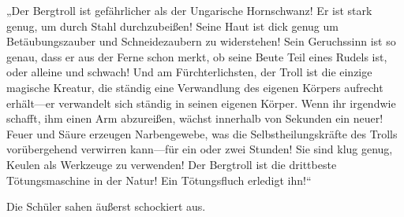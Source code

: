 „Der Bergtroll ist gefährlicher als der Ungarische Hornschwanz! Er ist stark genug, um durch Stahl durchzubeißen! Seine Haut ist dick genug um Betäubungszauber und Schneidezaubern zu widerstehen! Sein Geruchssinn ist so genau, dass er aus der Ferne schon merkt, ob seine Beute Teil eines Rudels ist, oder alleine und schwach! Und am Fürchterlichsten, der Troll ist die einzige magische Kreatur, die ständig eine Verwandlung des eigenen Körpers aufrecht erhält—er verwandelt sich ständig in seinen eigenen Körper. Wenn ihr irgendwie schafft, ihm einen Arm abzureißen, wächst innerhalb von Sekunden ein neuer! Feuer und Säure erzeugen Narbengewebe, was die Selbstheilungskräfte des Trolls vorübergehend verwirren kann—für ein oder zwei Stunden! Sie sind klug genug, Keulen als Werkzeuge zu verwenden! Der Bergtroll ist die drittbeste Tötungsmaschine in der Natur! Ein Tötungsfluch erledigt ihn!“

Die Schüler sahen äußerst schockiert aus.

